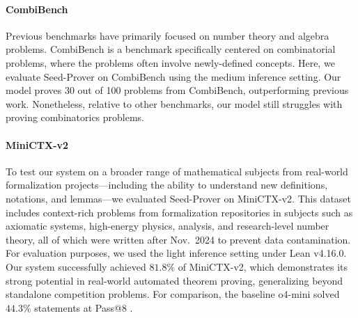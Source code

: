 \paragraph{CombiBench \citep{liu2025combibench}} Previous benchmarks have primarily focused on number theory and algebra problems. CombiBench is a benchmark specifically centered on combinatorial problems, where the problems often involve newly-defined concepts. Here, we evaluate Seed-Prover on CombiBench using the medium inference setting. Our model proves 30 out of 100 problems from CombiBench, outperforming previous work. Nonetheless, relative to other benchmarks, our model still struggles with proving combinatorics problems.

\paragraph{MiniCTX-v2}\citep{hu2025minictx} To test our system on a broader range of mathematical subjects from real-world formalization projects—including the ability to understand new definitions, notations, and lemmas—we evaluated Seed-Prover on MiniCTX-v2. This dataset includes context-rich problems from formalization repositories in subjects such as axiomatic systems, high-energy physics, analysis, and research-level number theory, all of which were written after Nov.~2024 to prevent data contamination. For evaluation purposes, we used the light inference setting under Lean v4.16.0. Our system successfully achieved $81.8\%$ of MiniCTX-v2, which demonstrates its strong potential in real-world automated theorem proving, generalizing beyond standalone competition problems. For comparison, the baseline o4-mini solved $44.3\%$ statements at Pass@8 \citep{minictx_leaderboard_website}.